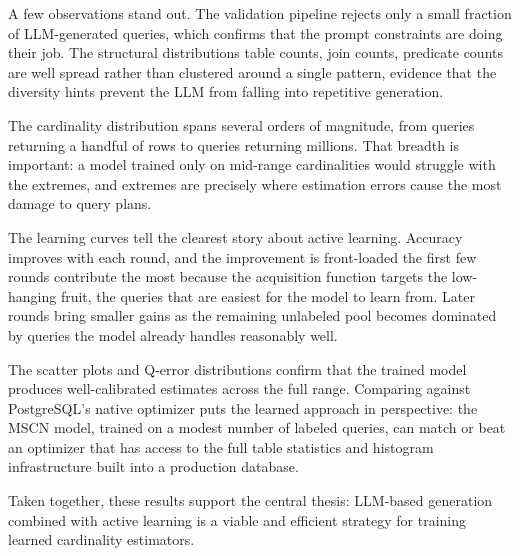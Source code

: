 A few observations stand out. The validation pipeline rejects only a small fraction of LLM-generated queries, which confirms that the prompt constraints are doing their job. The structural distributions table counts, join counts, predicate counts are well spread rather than clustered around a single pattern, evidence that the diversity hints prevent the LLM from falling into repetitive generation.

The cardinality distribution spans several orders of magnitude, from queries returning a handful of rows to queries returning millions. That breadth is important: a model trained only on mid-range cardinalities would struggle with the extremes, and extremes are precisely where estimation errors cause the most damage to query plans.

The learning curves tell the clearest story about active learning. Accuracy improves with each round, and the improvement is front-loaded the first few rounds contribute the most because the acquisition function targets the low-hanging fruit, the queries that are easiest for the model to learn from. Later rounds bring smaller gains as the remaining unlabeled pool becomes dominated by queries the model already handles reasonably well.

The scatter plots and Q-error distributions confirm that the trained model produces well-calibrated estimates across the full range. Comparing against PostgreSQL's native optimizer puts the learned approach in perspective: the MSCN model, trained on a modest number of labeled queries, can match or beat an optimizer that has access to the full table statistics and histogram infrastructure built into a production database.

Taken together, these results support the central thesis: LLM-based generation combined with active learning is a viable and efficient strategy for training learned cardinality estimators.
